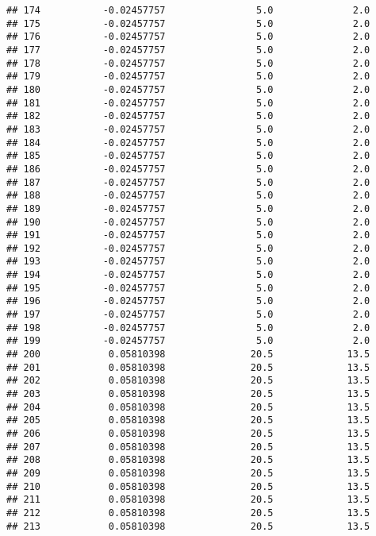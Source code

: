 \documentclass[]{article}
\begin{document}
\begin{verbatim}
## 174           -0.02457757                5.0              2.0
## 175           -0.02457757                5.0              2.0
## 176           -0.02457757                5.0              2.0
## 177           -0.02457757                5.0              2.0
## 178           -0.02457757                5.0              2.0
## 179           -0.02457757                5.0              2.0
## 180           -0.02457757                5.0              2.0
## 181           -0.02457757                5.0              2.0
## 182           -0.02457757                5.0              2.0
## 183           -0.02457757                5.0              2.0
## 184           -0.02457757                5.0              2.0
## 185           -0.02457757                5.0              2.0
## 186           -0.02457757                5.0              2.0
## 187           -0.02457757                5.0              2.0
## 188           -0.02457757                5.0              2.0
## 189           -0.02457757                5.0              2.0
## 190           -0.02457757                5.0              2.0
## 191           -0.02457757                5.0              2.0
## 192           -0.02457757                5.0              2.0
## 193           -0.02457757                5.0              2.0
## 194           -0.02457757                5.0              2.0
## 195           -0.02457757                5.0              2.0
## 196           -0.02457757                5.0              2.0
## 197           -0.02457757                5.0              2.0
## 198           -0.02457757                5.0              2.0
## 199           -0.02457757                5.0              2.0
## 200            0.05810398               20.5             13.5
## 201            0.05810398               20.5             13.5
## 202            0.05810398               20.5             13.5
## 203            0.05810398               20.5             13.5
## 204            0.05810398               20.5             13.5
## 205            0.05810398               20.5             13.5
## 206            0.05810398               20.5             13.5
## 207            0.05810398               20.5             13.5
## 208            0.05810398               20.5             13.5
## 209            0.05810398               20.5             13.5
## 210            0.05810398               20.5             13.5
## 211            0.05810398               20.5             13.5
## 212            0.05810398               20.5             13.5
## 213            0.05810398               20.5             13.5

\end{verbatim}
\end{document}
